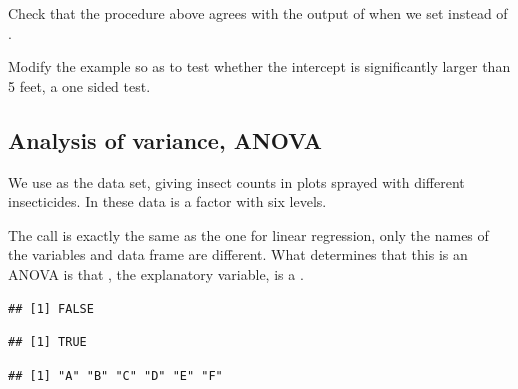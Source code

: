 \documentclass[krantz2]{krantz}\usepackage{knitr}%
\begin{document}
\begin{advplayground}
Check that the procedure above agrees with the output of  when we set  instead of .

Modify the example so as to test whether the intercept is significantly larger than 5 feet, a one sided test.
\end{advplayground}

\subsection{Analysis of variance, ANOVA}\label{sec:anova}
We use as the  data set, giving insect counts in plots sprayed with different insecticides. In these data  is a factor with six levels.%
\label{xmpl:fun:lm:fm4}

The call is exactly the same as the one for linear regression, only the names of the variables and data frame are different. What determines that this is an ANOVA is that , the explanatory variable, is a .

\begin{knitrout}\footnotesize
{}\color{fgcolor}\begin{kframe}
\begin{alltt}
\hlopt{$}
\end{alltt}
\begin{verbatim}
## [1] FALSE
\end{verbatim}
\begin{alltt}
\hlopt{$}
\end{alltt}
\begin{verbatim}
## [1] TRUE
\end{verbatim}
\begin{alltt}
\hlopt{$}
\end{alltt}
\begin{verbatim}
## [1] "A" "B" "C" "D" "E" "F"
\end{verbatim}
\end{kframe}
\end{knitrout}
\end{document}
